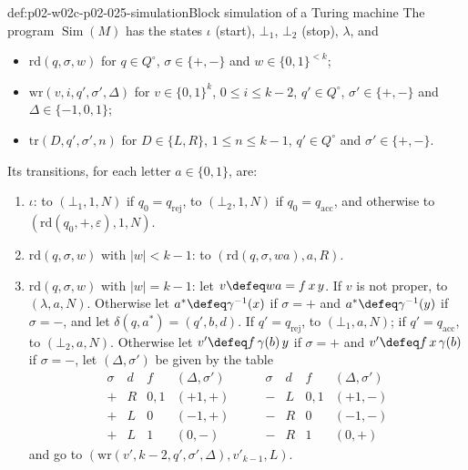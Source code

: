 \begin{hbdefinition}{def:p02-w02c-p02-025-simulation}{Block simulation of a Turing machine}
The program \(\operatorname{Sim}(M)\) has the states
\(\iota\) (start), \(\bot_1\), \(\bot_2\) (stop), \(\lambda\), and
\begin{itemize}
\item \(\mathrm{rd}(q,\sigma,w)\) for \(q\in Q^{\circ}\), \(\sigma\in\{+,-\}\)
  and \(w\in\{0,1\}^{<k}\);
\item \(\mathrm{wr}(v,i,q',\sigma',\Delta)\) for \(v\in\{0,1\}^k\),
  \(0\leq i\leq k-2\), \(q'\in Q^{\circ}\), \(\sigma'\in\{+,-\}\) and
  \(\Delta\in\{-1,0,1\}\);
\item \(\mathrm{tr}(D,q',\sigma',n)\) for \(D\in\{L,R\}\),
  \(1\leq n\leq k-1\), \(q'\in Q^{\circ}\) and \(\sigma'\in\{+,-\}\).
\end{itemize}
Its transitions, for each letter \(a\in\{0,1\}\), are:
\begin{enumerate}
\item \(\iota\): to \((\bot_1,1,N)\) if \(q_0=q_{\mathrm{rej}}\), to
  \((\bot_2,1,N)\) if \(q_0=q_{\mathrm{acc}}\), and otherwise to
  \((\mathrm{rd}(q_0,+,\varepsilon),1,N)\).
\item \(\mathrm{rd}(q,\sigma,w)\) with \(\lvert w\rvert<k-1\): to
  \((\mathrm{rd}(q,\sigma,wa),a,R)\).
\item \(\mathrm{rd}(q,\sigma,w)\) with \(\lvert w\rvert=k-1\): let
  \(v\defeq wa=f\,x\,y\).  If \(v\) is not proper, to \((\lambda,a,N)\).
  Otherwise let \(a^{*}\defeq\gamma^{-1}(x)\) if \(\sigma=+\) and
  \(a^{*}\defeq\gamma^{-1}(y)\) if \(\sigma=-\), and let
  \(\delta(q,a^{*})=(q',b,d)\).  If \(q'=q_{\mathrm{rej}}\), to
  \((\bot_1,a,N)\); if \(q'=q_{\mathrm{acc}}\), to \((\bot_2,a,N)\).  Otherwise
  let \(v'\defeq f\,\gamma(b)\,y\) if \(\sigma=+\) and
  \(v'\defeq f\,x\,\gamma(b)\) if \(\sigma=-\), let \((\Delta,\sigma')\) be
  given by the table
  \[
  \begin{array}{c|c|c|c}
   \sigma & d & f & (\Delta,\sigma')\\\hline
   + & R & 0,1 & (+1,+)\\
   + & L & 0 & (-1,+)\\
   + & L & 1 & (0,-)
  \end{array}
  \qquad
  \begin{array}{c|c|c|c}
   \sigma & d & f & (\Delta,\sigma')\\\hline
   - & L & 0,1 & (+1,-)\\
   - & R & 0 & (-1,-)\\
   - & R & 1 & (0,+)
  \end{array}
  \]
  and go to \((\mathrm{wr}(v',k-2,q',\sigma',\Delta),v'_{k-1},L)\).

\end{enumerate}
\end{hbdefinition}

